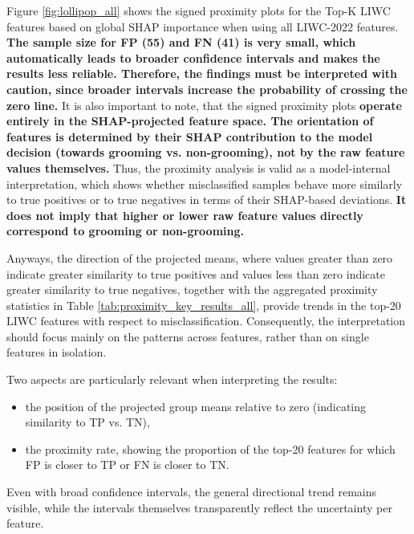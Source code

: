 Figure \ref{fig:lollipop_all} shows the signed proximity plots for the Top-K LIWC features based on global SHAP importance when using all LIWC-2022 features. \textbf{The sample size for FP (55) and FN (41) is very small, which automatically leads to broader confidence intervals and makes the results less reliable. Therefore, the findings must be interpreted with caution, since broader intervals increase the probability of crossing the zero line.} It is also important to note, that the signed proximity plots \textbf{operate entirely in the SHAP-projected feature space. The orientation of features is determined by their SHAP contribution to the model decision (towards grooming vs. non-grooming), not by the raw feature values themselves.} Thus, the proximity analysis is valid as a model-internal interpretation, which shows whether misclassified samples behave more similarly to true positives or to true negatives in terms of their SHAP-based deviations. \textbf{It does not imply that higher or lower raw feature values directly correspond to grooming or non-grooming.}

Anyways, the direction of the projected means, where values greater than zero indicate greater similarity to true positives and values less than zero indicate greater similarity to true negatives, together with the aggregated proximity statistics in Table \ref{tab:proximity_key_results_all}, provide trends in the top-20 LIWC features with respect to misclassification. Consequently, the interpretation should focus mainly on the patterns across features, rather than on single features in isolation.

Two aspects are particularly relevant when interpreting the results:
\begin{itemize}
\item the position of the projected group means relative to zero (indicating similarity to TP vs. TN),
\item the proximity rate, showing the proportion of the top-20 features for which FP is closer to TP or FN is closer to TN.
\end{itemize}

Even with broad confidence intervals, the general directional trend remains visible, while the intervals themselves transparently reflect the uncertainty per feature.

